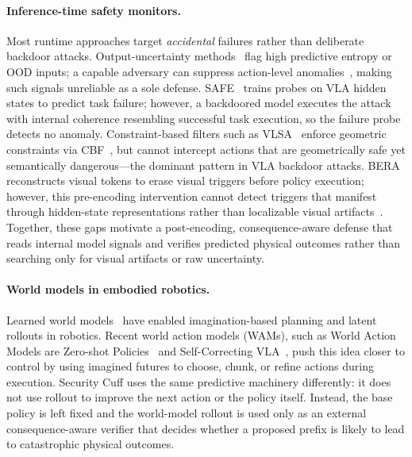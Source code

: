 \paragraph{Inference-time safety monitors.}
Most runtime approaches target \emph{accidental} failures rather
than deliberate backdoor attacks.
Output-uncertainty methods~\citep{mahal,ensemble_ood} flag high
predictive entropy or OOD inputs; a capable adversary can suppress
action-level anomalies~\citep{silentdrift}, making such signals
unreliable as a sole defense.
SAFE~\citep{safe} trains probes on VLA hidden states to predict
task failure; however, a backdoored model executes the attack with
internal coherence resembling successful task execution, so the
failure probe detects no anomaly.
Constraint-based filters such as VLSA~\citep{vlsa} enforce
geometric constraints via CBF~\citep{ames2017cbf}, but cannot
intercept actions that are geometrically safe yet semantically
dangerous---the dominant pattern in VLA backdoor attacks.
BERA~\citep{bera} reconstructs visual tokens to erase visual
triggers before policy execution; however, this pre-encoding
intervention cannot detect triggers that manifest through hidden-state
representations rather than localizable visual
artifacts~\citep{statebackdoor,silentdrift}.
Together, these gaps motivate a post-encoding,
consequence-aware defense that reads internal model signals and
verifies predicted physical outcomes rather than searching only for
visual artifacts or raw uncertainty.

\paragraph{World models in embodied robotics.}
Learned world models~\citep{ha2018world,daydreamer} have enabled
imagination-based planning and latent rollouts in robotics.
Recent world action models (WAMs), such as
World Action Models are Zero-shot Policies~\citep{wamzero} and
Self-Correcting VLA~\citep{scvla}, push this idea closer to control by
using imagined futures to choose, chunk, or refine actions during
execution.
Security Cuff uses the same predictive machinery differently: it does
not use rollout to improve the next action or the policy itself.
Instead, the base policy is left fixed and the world-model rollout is
used only as an external consequence-aware verifier that decides
whether a proposed prefix is likely to lead to catastrophic physical
outcomes.
